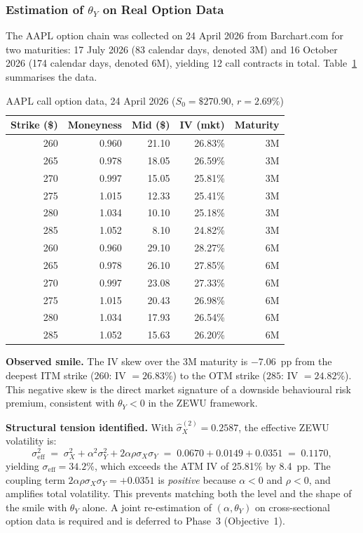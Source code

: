 \documentclass[12pt,a4paper]{article}
\theoremstyle{definition}
\theoremstyle{remark}
\begin{document}
\subsubsection{Estimation of $\theta_Y$ on Real Option Data}

The AAPL option chain was collected on 24 April 2026 from Barchart.com
for two maturities: 17 July 2026 (83 calendar days, denoted 3M) and
16 October 2026 (174 calendar days, denoted 6M), yielding 12 call
contracts in total. Table~\ref{tab:optchain} summarises the data.

\begin{table}[H]
  \centering
  \caption{AAPL call option data, 24 April 2026 ($S_0 = \$270.90$,
           $r = 2.69\%$)}
  \label{tab:optchain}
  \begin{tabular}{rrrrr}
    \toprule
    Strike (\$) & Moneyness & Mid (\$) & IV (mkt) & Maturity \\
    \midrule
    260 & 0.960 & 21.10 & 26.83\% & 3M \\
    265 & 0.978 & 18.05 & 26.59\% & 3M \\
    270 & 0.997 & 15.05 & 25.81\% & 3M \\
    275 & 1.015 & 12.33 & 25.41\% & 3M \\
    280 & 1.034 & 10.10 & 25.18\% & 3M \\
    285 & 1.052 &  8.10 & 24.82\% & 3M \\
    260 & 0.960 & 29.10 & 28.27\% & 6M \\
    265 & 0.978 & 26.10 & 27.85\% & 6M \\
    270 & 0.997 & 23.08 & 27.33\% & 6M \\
    275 & 1.015 & 20.43 & 26.98\% & 6M \\
    280 & 1.034 & 17.93 & 26.54\% & 6M \\
    285 & 1.052 & 15.63 & 26.20\% & 6M \\
    \bottomrule
  \end{tabular}
\end{table}

\noindent\textbf{Observed smile.} The IV skew over the 3M maturity is
$-7.06$~pp from the deepest ITM strike ($260$: IV $= 26.83\%$) to the
OTM strike ($285$: IV $= 24.82\%$). This negative skew is the direct
market signature of a downside behavioural risk premium, consistent
with $\theta_Y < 0$ in the ZEWU framework.

\noindent\textbf{Structural tension identified.} With
$\hat{\sigma}_X^{(2)} = 0.2587$, the effective ZEWU volatility is:
\begin{equation}
  \sigma_{\mathrm{eff}}^2 \;=\;
  \sigma_X^2 + \alpha^2\sigma_Y^2 + 2\alpha\rho\sigma_X\sigma_Y
  \;=\; 0.0670 + 0.0149 + 0.0351 \;=\; 0.1170,
\end{equation}
yielding $\sigma_{\mathrm{eff}} = 34.2\%$, which exceeds the ATM IV
of 25.81\% by 8.4~pp. The coupling term $2\alpha\rho\sigma_X\sigma_Y
= +0.0351$ is \emph{positive} because $\alpha < 0$ and $\rho < 0$,
and amplifies total volatility. This prevents matching both the level
and the shape of the smile with $\theta_Y$ alone. A joint
re-estimation of $(\alpha, \theta_Y)$ on cross-sectional option data
is required and is deferred to Phase~3 (Objective~1).
\end{document}
